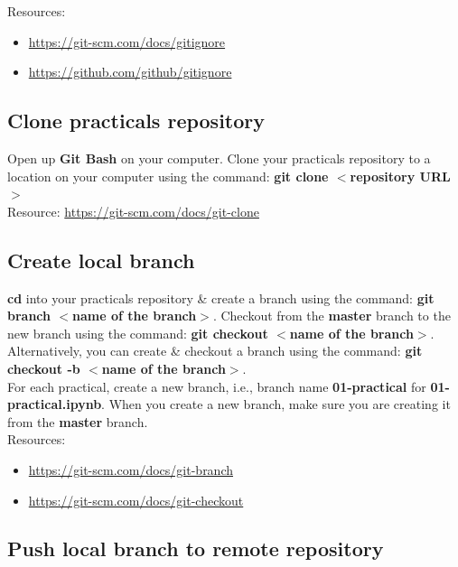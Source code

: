 \documentclass{article}
\begin{document}
Resources: 
\begin{itemize}
	\item \href{https://git-scm.com/docs/gitignore}{https://git-scm.com/docs/gitignore}
	\item \href{https://github.com/github/gitignore}{https://github.com/github/gitignore}
\end{itemize}

\subsection*{Clone practicals repository} 

Open up \textbf{Git Bash} on your computer. Clone your practicals repository to a location on your computer using the command: \textbf{git clone $<$repository URL$>$} \\

Resource: \href{https://git-scm.com/docs/git-clone}{https://git-scm.com/docs/git-clone}

\subsection*{Create local branch} 

\textbf{cd} into your practicals repository \& create a branch using the command: \textbf{git branch $<$name of the branch$>$}. Checkout from the \textbf{master} branch to the new branch using the command: \textbf{git checkout $<$name of the branch$>$}. Alternatively, you can create \& checkout a branch using the command: \textbf{git checkout -b $<$name of the branch$>$}. \\

For each practical, create a new branch, i.e., branch name \textbf{01-practical} for \textbf{01-practical.ipynb}. When you create a new branch, make sure you are creating it from the \textbf{master} branch. \\

Resources: 
\begin{itemize}
	\item \href{https://git-scm.com/docs/git-branch}{https://git-scm.com/docs/git-branch}
	\item \href{https://git-scm.com/docs/git-checkout}{https://git-scm.com/docs/git-checkout}
\end{itemize}

\subsection*{Push local branch to remote repository} 
\end{document}
